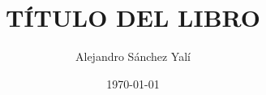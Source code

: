 

\title{TÍTULO DEL LIBRO}
\author{Alejandro Sánchez Yalí}
\date{\today}


\makeglossaries



\frontmatter





\tableofcontents
\listoffigures
\listoftables

\mainmatter





\backmatter

\printbibliography

\printglossaries
\printindex


